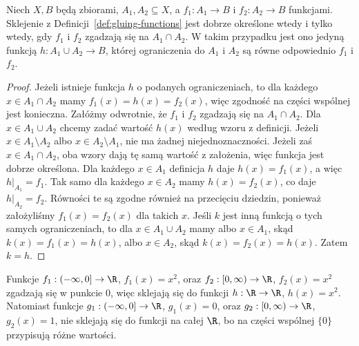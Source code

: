 \begin{twierdzenie}\label{thm:gluing-functions}
Niech $X,B$ będą zbiorami, $A_1,A_2\subseteq X$, a
$f_1:A_1\to B$ i $f_2:A_2\to B$ funkcjami.
Sklejenie z Definicji~\ref{def:gluing-functions} jest dobrze określone wtedy i tylko wtedy,
gdy $f_1$ i $f_2$ zgadzają się na $A_1\cap A_2$. W takim przypadku jest ono jedyną funkcją
$h:A_1\cup A_2\to B$, której ograniczenia do $A_1$ i $A_2$ są równe odpowiednio $f_1$ i $f_2$.
\end{twierdzenie}
\begin{proof}
Jeżeli istnieje funkcja $h$ o podanych ograniczeniach, to dla każdego $x\in A_1\cap A_2$
mamy $f_1(x)=h(x)=f_2(x)$, więc zgodność na części wspólnej jest konieczna.
Załóżmy odwrotnie, że $f_1$ i $f_2$ zgadzają się na $A_1\cap A_2$.
Dla $x\in A_1\cup A_2$ chcemy zadać wartość $h(x)$ według wzoru z definicji.
Jeżeli $x\in A_1\setminus A_2$ albo $x\in A_2\setminus A_1$, nie ma żadnej niejednoznaczności.
Jeżeli zaś $x\in A_1\cap A_2$, oba wzory dają tę samą wartość z założenia, więc funkcja jest dobrze określona.
Dla każdego $x\in A_1$ definicja $h$ daje $h(x)=f_1(x)$,
a więc $h|_{A_1}=f_1$. Tak samo dla każdego $x\in A_2$
mamy $h(x)=f_2(x)$, co daje $h|_{A_2}=f_2$.
Równości te są zgodne również na przecięciu dziedzin,
ponieważ założyliśmy $f_1(x)=f_2(x)$ dla takich $x$.
Jeśli $k$ jest inną funkcją o tych samych ograniczeniach, to dla $x\in A_1\cup A_2$ mamy
albo $x\in A_1$, skąd $k(x)=f_1(x)=h(x)$, albo $x\in A_2$, skąd $k(x)=f_2(x)=h(x)$.
Zatem $k=h$.
\end{proof}

\begin{przyklad}
Funkcje $f_1:(-\infty,0]\to\R$, $f_1(x)=x^2$, oraz
$f_2:[0,\infty)\to\R$, $f_2(x)=x^2$ zgadzają się w punkcie $0$,
więc sklejają się do funkcji $h:\R\to\R$, $h(x)=x^2$.
Natomiast funkcje $g_1:(-\infty,0]\to\R$, $g_1(x)=0$, oraz
$g_2:[0,\infty)\to\R$, $g_2(x)=1$, nie sklejają się do funkcji
na całej $\R$, bo na części wspólnej $\{0\}$
przypisują różne wartości.
\end{przyklad}


